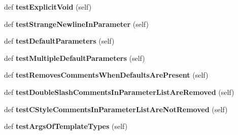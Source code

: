 \begin{DoxyCompactItemize}
\item 
def {\bfseries test\+Explicit\+Void} (self)\hypertarget{classcpp_1_1gmock__class__test_1_1GenerateMethodsTest_a4db373bb8953d0523425b5a3f392e761}{}\label{classcpp_1_1gmock__class__test_1_1GenerateMethodsTest_a4db373bb8953d0523425b5a3f392e761}

\item 
def {\bfseries test\+Strange\+Newline\+In\+Parameter} (self)\hypertarget{classcpp_1_1gmock__class__test_1_1GenerateMethodsTest_a184995b077a46f3408fa203cb0626614}{}\label{classcpp_1_1gmock__class__test_1_1GenerateMethodsTest_a184995b077a46f3408fa203cb0626614}

\item 
def {\bfseries test\+Default\+Parameters} (self)\hypertarget{classcpp_1_1gmock__class__test_1_1GenerateMethodsTest_a61abb614ad02a1fef3ece3813695c22a}{}\label{classcpp_1_1gmock__class__test_1_1GenerateMethodsTest_a61abb614ad02a1fef3ece3813695c22a}

\item 
def {\bfseries test\+Multiple\+Default\+Parameters} (self)\hypertarget{classcpp_1_1gmock__class__test_1_1GenerateMethodsTest_a41b91cc39a55385b8c4b97d804e80345}{}\label{classcpp_1_1gmock__class__test_1_1GenerateMethodsTest_a41b91cc39a55385b8c4b97d804e80345}

\item 
def {\bfseries test\+Removes\+Comments\+When\+Defaults\+Are\+Present} (self)\hypertarget{classcpp_1_1gmock__class__test_1_1GenerateMethodsTest_add445941c6503198f0c3a25e00d20b9f}{}\label{classcpp_1_1gmock__class__test_1_1GenerateMethodsTest_add445941c6503198f0c3a25e00d20b9f}

\item 
def {\bfseries test\+Double\+Slash\+Comments\+In\+Parameter\+List\+Are\+Removed} (self)\hypertarget{classcpp_1_1gmock__class__test_1_1GenerateMethodsTest_abb9fce46de4ac1d2943b85e84ce14c83}{}\label{classcpp_1_1gmock__class__test_1_1GenerateMethodsTest_abb9fce46de4ac1d2943b85e84ce14c83}

\item 
def {\bfseries test\+C\+Style\+Comments\+In\+Parameter\+List\+Are\+Not\+Removed} (self)\hypertarget{classcpp_1_1gmock__class__test_1_1GenerateMethodsTest_afa44c6ac675ce7454ff0f51164bde59e}{}\label{classcpp_1_1gmock__class__test_1_1GenerateMethodsTest_afa44c6ac675ce7454ff0f51164bde59e}

\item 
def {\bfseries test\+Args\+Of\+Template\+Types} (self)\hypertarget{classcpp_1_1gmock__class__test_1_1GenerateMethodsTest_ade05313ccffe74f9eaa42fb66c14f702}{}\label{classcpp_1_1gmock__class__test_1_1GenerateMethodsTest_ade05313ccffe74f9eaa42fb66c14f702}


\end{DoxyCompactItemize}
